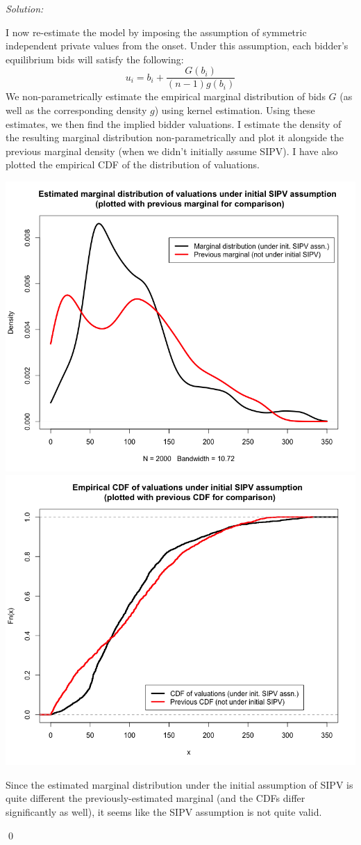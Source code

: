 \documentclass[12pt]{article}
\newenvironment{sol}
    {\emph{Solution:}
    }
    {
    \qed
    }
\begin{document}
\begin{sol}
    I now re-estimate the model by imposing the assumption of symmetric independent private values from the onset. Under this assumption, each bidder's equilibrium bids will satisfy the following:
    \[u_i = b_i + \frac{G(b_i)}{(n-1)g(b_i)}\]
    We non-parametrically estimate the empirical marginal distribution of bids $G$ (as well as the corresponding density $g$) using kernel estimation. Using these estimates, we then find the implied bidder valuations. I estimate the density of the resulting marginal distribution non-parametrically and plot it alongside the previous marginal density (when we didn't initially assume SIPV). I have also plotted the empirical CDF of the distribution of valuations.
    \begin{center}
        \includegraphics[scale=0.45]{Marginal SIPV.png}\\
        \includegraphics[scale=0.45]{SIPV_CDF.png}
    \end{center}
    Since the estimated marginal distribution under the initial assumption of SIPV is quite different the previously-estimated marginal (and the CDFs differ significantly as well), it seems like the SIPV assumption is not quite valid.
\end{sol}
\end{document}
